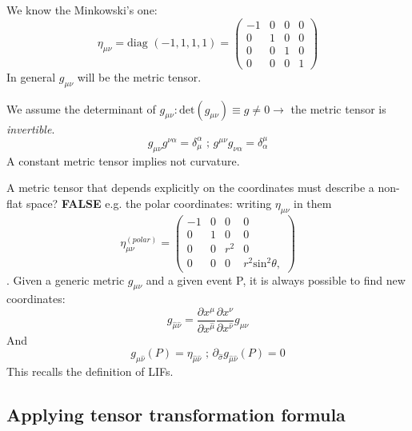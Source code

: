 We know the Minkowski's one:
\begin{equation}
\eta_{\mu \nu } = \text{diag }\left( -1,1,1,1 \right) = \begin{pmatrix}
-1 & 0 & 0 & 0 \\
0 & 1 & 0 & 0 \\
0 & 0 & 1 & 0 \\
0 & 0 & 0 & 1
\end{pmatrix} 
\end{equation}
\bigskip
In general $g_{\mu \nu }$ will be the metric tensor.\par
We assume the determinant of $g_{\mu \nu }: \text{det}\left( g_{\mu \nu } \right) \equiv g \neq 0 \to $ the metric tensor is \emph{invertible}.
\[
g_{\mu \nu }g^{\nu \alpha } = \delta^{\alpha }_{\mu } \text{ ; } g^{\mu \nu }g_{\nu \alpha } = \delta^{\mu }_{\alpha }
\]
A constant metric tensor implies not curvature.\par
A metric tensor that depends explicitly on the coordinates must describe a non-flat space? \textbf{FALSE} e.g. the polar coordinates: writing $\eta_{\mu \nu }$ in them
\begin{equation}
\eta_{\mu \nu }^{\left(polar\right)} = \begin{pmatrix}
-1 & 0 & 0 & 0 \\
0 & 1 & 0 & 0 \\
0 & 0 & r^{2} & 0 \\
0 & 0 & 0 & r^{2} \text{sin}^{2}\theta ,
\end{pmatrix} 
\end{equation}.
Given a generic metric $g_{\mu \nu }$ and a given event P, it is always possible to find new coordinates:
\[
g_{\hat{\mu }\hat{\nu }} = \frac{\partial x^{\mu }}{\partial x^{\hat{\mu }}} \frac{\partial x^{\nu }}{\partial x^{\hat{\nu }}} g_{\mu \nu }
\]
And
\[
g_{\hat{\mu }\hat{\nu }}\left( P \right) = \eta_{\hat{\mu }\hat{\nu }} \text{ ; } \partial_{\hat{\sigma }}g_{\hat{\mu }\hat{\nu }}\left( P \right)=0
\]
This recalls the definition of LIFs.


\subsection{Applying tensor transformation formula}\label{ex:changebasis}

